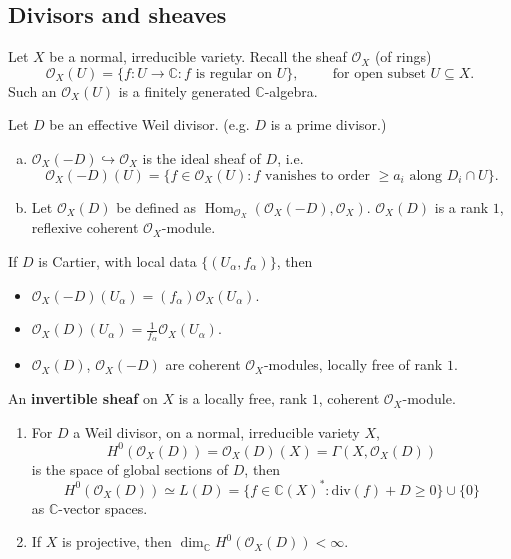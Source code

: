 \documentclass[a4paper,12pt]{amsart}
\newcommand{\CC}{\mathbb{C}}
\newcommand{\OO}{\ensuremath{\mathcal{O}}}
\newcommand{\divof}[1]{\mathrm{div}(#1)}
\DeclareMathOperator{\Hom}{Hom}
\begin{document}
\subsection{Divisors and sheaves}
Let $X$ be a normal, irreducible variety. Recall the sheaf $\OO_X$ (of rings)
\begin{equation*}
	\OO_X(U)=\{f:U\to\CC: f \text{ is regular on }U\}, \hspace{1cm}\text{for open subset }U\subseteq X.
\end{equation*}
Such an $\OO_X(U)$ is a finitely generated $\CC$-algebra.
\begin{Def}
	Let $D$ be an effective Weil divisor. (e.g. $D$ is a prime divisor.)
	\begin{enumerate}[(a)]
		\item $\OO_X(-D)\hookrightarrow\OO_X$ is the ideal sheaf of $D$, i.e. 
		\begin{equation*}
			\OO_X(-D)(U)=\{f\in\OO_X(U):f \text{ vanishes to order }\geq a_i \text{ along }D_i\cap U\}.
		\end{equation*}
		\item Let $\OO_X(D)$ be defined as $\Hom_{\OO_X}(\OO_X(-D),\OO_X)$. $\OO_X(D)$ is a rank $1$, reflexive coherent $\OO_X$-module.
	\end{enumerate}
\end{Def}
If $D$ is Cartier, with local data $\{(U_\alpha,f_\alpha)\}$, then
\begin{itemize}
	\item $\OO_X(-D)(U_\alpha)=(f_\alpha)\OO_X(U_\alpha)$.
	\item $\OO_X(D)(U_\alpha)=\frac{1}{f_\alpha}\OO_X(U_\alpha)$.
	\item $\OO_X(D)$, $\OO_X(-D)$ are coherent $\OO_X$-modules, locally free of rank $1$.
\end{itemize}
\begin{Def}
	An \textbf{invertible sheaf} on $X$ is a locally free, rank $1$, coherent $\OO_X$-module.
\end{Def}
\begin{Fact}
	\begin{enumerate}
		\item For $D$ a Weil divisor, on a normal, irreducible variety $X$,
		\begin{equation*}
		H^{0}(\OO_X(D))=\OO_X(D)(X)=\Gamma(X,\OO_X(D))
		\end{equation*}
		is the space of global sections of $D$, then
		\begin{equation*}
		H^{0}(\OO_X(D))\simeq L(D)=\{f\in\CC(X)^{*}:\divof{f}+D\geq 0\}\cup\{0\}
		\end{equation*}
		as $\CC$-vector spaces.
		\item If $X$ is projective, then $\dim_\CC H^{0}(\OO_X(D))<\infty$.
	\end{enumerate}
	
\end{Fact}
\newpage
\end{document}
